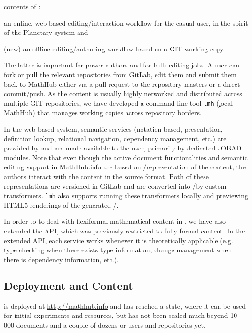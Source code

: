 contents of \sys: 
\begin{inparaenum}[\em i\rm)]
\item an online, web-based editing/interaction workflow for the casual user, in the spirit
  of the Planetary system and
\item (new) an offline editing/authoring workflow based on a GIT working copy.
\end{inparaenum}
The latter is important for power authors and for bulk editing jobs. A user can fork or
pull the relevant repositories from GitLab, edit them and submit them back to MathHub
either via a pull request to the repository masters or a direct commit/push. As the
content is usually highly networked and distributed across multiple GIT repositories, we
have developed a command line tool \texttt{lmh} (\underline{l}ocal
\underline{M}ath\underline{H}ub) that manages working copies across repository
borders. 

In the web-based system, semantic services (notation-based, presentation, definition
lookup, relational navigation, dependency management, etc.) are provided by \mmt and are
made available to the user, primarily by dedicated JOBAD~\cite{GLR:WebSvcActMathDoc09}
modules.  Note that even though the active document functionalities and semantic editing
support in MathHub.info are based on \omdoc/\mmt representation of the content, the
authors interact with the content in the source format. Both of these representations are
versioned in GitLab and are converted into \omdoc/\mmt by custom
transformers. \texttt{lmh} also supports running these transformers locally and previewing
HTML5 renderings of the generated \omdoc/\mmt.

In order to to deal with flexiformal mathematical content in \omdoc, we have also extended
the \mmt API, which was previously restricted to fully formal content. In the extended
\mmt API, each \mmt service works whenever it is theoretically applicable (e.g. type
checking when there exists type information, change management when there is dependency
information, etc.).

\subsection{Deployment and Content}

\sys is deployed at \url{http://mathhub.info} and has reached a state, where it can be
used for initial experiments and resources, but has not been scaled much beyond 10\,000
documents and a couple of dozens or users and repositories yet.


